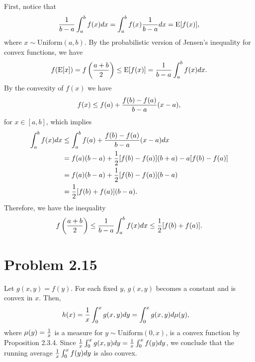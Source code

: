 \documentclass{scrartcl}
\begin{document}
First, notice that
\begin{equation}
	\begin{split}
			{1 \over {b-a}} \int_a^b f(x) dx = \int_a^b f(x) {1 \over {b-a}} dx = \mathrm{E}[f(x)],
	\end{split}
\end{equation}
where $x \sim \text{Uniform}(a,b)$.
By the probabilistic version of Jensen's inequality for convex functions, we have
\begin{equation}
	f(\mathrm{E}[x]) = f\left({{a+b} \over 2}\right) \le \mathrm{E}[f(x)] = {1 \over {b-a}} \int_a^b f(x) dx .
\end{equation}
By the convexity of $f(x)$ we have
\begin{equation}
	f(x) \le f(a) + {{f(b)-f(a)} \over {b-a}} (x-a),
\end{equation}
for $x \in [a, b]$, which implies
\begin{equation}
	\begin{split}
		\int_a^b f(x) dx & \le \int_a^b f(a) + {{f(b)-f(a)} \over {b-a}} (x-a) dx \\
		& = f(a)(b-a)+{1 \over 2}[f(b)-f(a)](b+a)-a[f(b)-f(a)] \\
		& = f(a)(b-a)+{1 \over 2}[f(b)-f(a)](b-a) \\
		& = {1 \over 2}[f(b)+f(a)](b-a).
	\end{split}
\end{equation}
Therefore, we have the inequality
\begin{equation}
	f\left({{a+b} \over 2}\right) \le {1 \over {b-a}} \int_a^b f(x) dx \le {1 \over 2}[f(b)+f(a)].
\end{equation}





\section*{Problem 2.15}
Let $g(x,y) = f(y)$. For each fixed $y$, $g(x,y)$ becomes a constant and is convex in $x$.
Then,
\begin{equation}
	\begin{split}
	    h(x) & = {1 \over x} \int_0^x g(x, y) dy
	    	       =  \int_0^x g(x, y) d \mu(y),
	\end{split}
\end{equation}
where $\mu(y) = {1 \over x}$ is a measure for $y \sim \text{Uniform}(0, x)$,
is a convex function by Proposition 2.3.4.
Since ${1 \over x} \int_0^x g(x, y) dy = {1 \over x} \int_0^x f(y) dy$, we conclude that
the running average ${1 \over x} \int_0^x f(y) dy$ is also convex.
\end{document}

